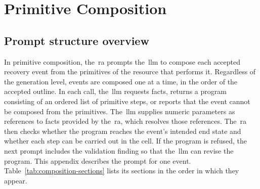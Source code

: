 
\FloatBarrier
\section{Primitive Composition}\label{sec:composition}

\subsection{Prompt structure overview}\label{sec:composition-overview}

In primitive composition, the~\gls{ra} prompts the~\gls{llm} to compose each accepted recovery event from the
primitives of the resource that performs it. Regardless of the generation level, events are
composed one at a time, in the order of the accepted outline. In each call, the~\gls{llm} requests facts, returns a program consisting of an ordered
list of primitive steps, or reports that the event cannot be composed from the primitives.
The~\gls{llm} supplies numeric parameters as references to facts provided by the~\gls{ra}, which resolves
those references. The~\gls{ra} then checks whether the program reaches the event's intended end state
and whether each step can be carried out in the cell. If the program is refused, the next prompt
includes the validation finding so that the~\gls{llm} can revise the program. This appendix describes
the prompt for one event. Table~\ref{tab:composition-sections} lists its sections in the order in
which they appear.

